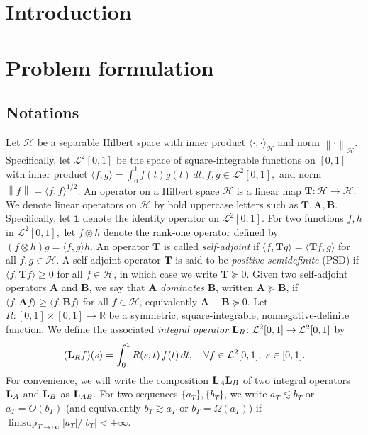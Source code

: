 \documentclass[mnsc]{informs3aa} %
\newcommand{\norm}[1]{\left\|#1\right\|}
\newcommand{\bL}{\bold L}
\newcommand{\idty}{\mathbf{1}}
\newcommand{\mL}{\mathcal L}
\newcommand{\mH}{\mathcal H}
\begin{document}
	\maketitle
	\section{Introduction}
	\section{Problem formulation}
	\subsection{Notations}
	Let $\mathcal{H}$ be a separable Hilbert space with inner product 
	$\langle \cdot, \cdot \rangle_{\mH}$ and norm $\norm{\cdot}_{\mH}$. Specifically, let
	$\mL^2[0,1]$ be the space of square-integrable functions on $[0,1]$ with inner product 
	\(
	\langle f,g \rangle = \int_0^1 f(t) g(t)\,dt,  f,g \in \mL^2[0,1],
	\)
	and norm $\norm{f} = \langle f,f \rangle^{1/2}$. An operator on a Hilbert space $\mathcal{H}$ is a linear map $\mathbf{T}:\mathcal{H}\to\mathcal{H}.$ 
	We denote linear operators on $\mathcal{H}$ by bold uppercase letters such as $\mathbf{T}, \mathbf{A}, \mathbf{B}$. Specifically, let $\idty$ denote the identity operator on $\mL^2[0,1].$ For two functions $f,h$ in $\mL^2[0,1],$ let $f\otimes h$ denote the rank-one operator defined by \((f\otimes h)g=\langle f,g\rangle h.\) An operator $\mathbf{T}$ is called \emph{self-adjoint} if $\langle f, \mathbf{T} g \rangle = \langle \mathbf{T} f, g \rangle$ for all $f,g \in \mathcal{H}$. A self-adjoint operator $\mathbf{T}$ is said to be \emph{positive semidefinite} (PSD) if $\langle f, \mathbf{T} f \rangle \geq 0$ for all $f \in \mathcal{H}$, in which case we write $\mathbf{T} \succeq 0$. Given two self-adjoint operators $\mathbf{A}$ and $\mathbf{B}$, we say that $\mathbf{A}$ \emph{dominates} $\mathbf{B}$, written $\mathbf{A} \succeq \mathbf{B}$, if $\langle f, \mathbf{A} f \rangle \geq \langle f, \mathbf{B} f \rangle$ for all $f \in \mathcal{H}$, equivalently $\mathbf{A} - \mathbf{B} \succeq 0$. Let \(R : [0,1] \times [0,1] \to \mathbb{R}\) be a symmetric, square-integrable, nonnegative-definite function. We define the associated \emph{integral operator} \(\bL_R\colon \mL^2[0,1] \to \mL^2[0,1]\) by
	\[
	(\bL_R f)(s) = \int_0^1 R(s, t)\, f(t)\, dt, 
	\quad \forall f \in \mL^2[0,1], \; s \in [0,1].
	\]
	For convenience, we will write the composition $\bL_{A}\bL_B$ of two integral operators $\bL_A$ and $\bL_B$ as $\bL_{AB}.$
	For two sequences $\{a_T\},\{b_T\}$, we write $a_T\lesssim b_T$ or $a_T=O(b_T)$ (and equivalently $b_T\gtrsim a_T$ or $b_T=\Omega(a_T)$)
	if $\limsup_{T\to\infty} |a_T|/|b_T| < +\infty$.
\end{document}
